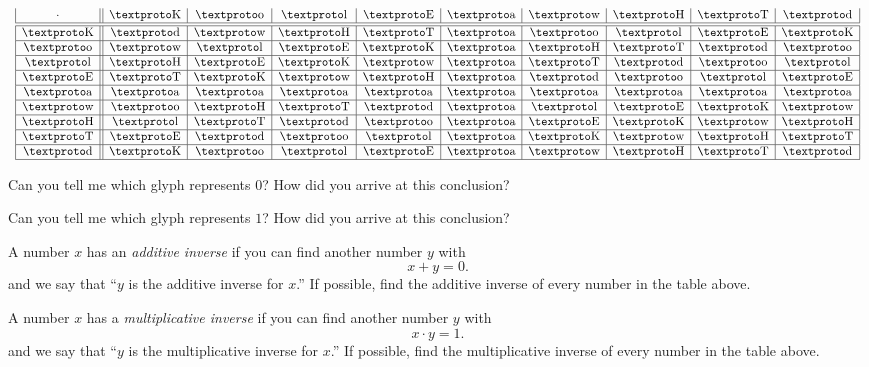 \[{\begin{array}{clc}
{\begin{array}{|c||c|c|c|c|c|c|c|c|c|}
\cdot & \ld & \li & \lh & \lf & \lo & \la & \lb & \lc &\loo \\ \hline\hline
\ld   &\loo & \la & \lb & \lc & \lo & \li & \lh & \lf & \ld \\ \hline
\li   & \la & \lh & \lf & \ld & \lo & \lb & \lc &\loo & \li \\ \hline
\lh   & \lb & \lf & \ld & \la & \lo & \lc &\loo & \li & \lh \\ \hline
\lf   & \lc & \ld & \la & \lb & \lo &\loo & \li & \lh & \lf \\ \hline
\lo   & \lo & \lo & \lo & \lo & \lo & \lo & \lo & \lo & \lo \\ \hline
\la   & \li & \lb & \lc &\loo & \lo & \lh & \lf & \ld & \la \\ \hline
\lb   & \lh & \lc &\loo & \li & \lo & \lf & \ld & \la & \lb \\ \hline
\lc   & \lf &\loo & \li & \lh & \lo & \ld & \la & \lb & \lc \\ \hline
\loo  & \ld & \li & \lh & \lf & \lo & \la & \lb & \lc &\loo \\ \hline
\end{array}} 
\end{array}}
\]

\newpage



\begin{prob} 
Can you tell me which glyph represents $0$? How did you arrive at this
conclusion?
\end{prob}

\begin{prob} 
Can you tell me which glyph represents $1$? How did you arrive at this
conclusion?
\end{prob}

\begin{prob}
A number $x$ has an \textit{additive inverse} if you can find another number $y$ with 
\[
x + y = 0.
\]
and we say that ``$y$ is the additive inverse for $x$.'' If possible,
find the additive inverse of every number in the table above.
\end{prob}

\begin{prob}
A number $x$ has a \textit{multiplicative inverse} if you can find
another number $y$ with
\[
x\cdot y = 1.
\]
and we say that ``$y$ is the multiplicative inverse for $x$.'' If
possible, find the multiplicative inverse of every number in the
table above.
\end{prob}



